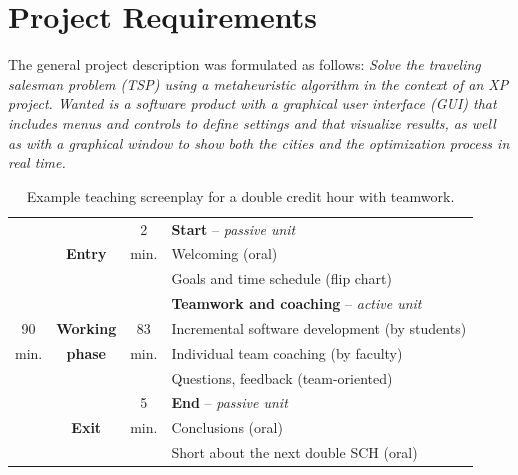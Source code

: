 \documentclass[conference]{IEEEtran}
\begin{document}
\section{Project Requirements}
\label{sec:projreq}

The general project description was formulated as follows: \textit{Solve the traveling salesman problem (TSP) using a metaheuristic algorithm in the context of an XP project. Wanted is a software product with a graphical user interface (GUI) that includes menus and controls to define settings and that visualize results, as well as with a graphical window to show both the cities and the optimization process in real time.}

\begin{table}[!t]
  \renewcommand{\arraystretch}{1.3}
  \setlength{\tabcolsep}{0.6em}
  \caption{Example teaching screenplay for a double credit hour with teamwork.}
  \label{tab:screenplay2}
  \centering
  \begin{tabular}{|c|c|c|l|}
    \hline
         &                  & 2    & \textbf{Start} -- \textit{passive unit} \\
         & \textbf{Entry}   & min. & \hspace{0.5em} Welcoming (oral) \\
         &                  &      & \hspace{0.5em} Goals and time schedule (flip chart) \\
    \cline{2-4}
         &                  &      & \textbf{Teamwork and coaching} -- \textit{active unit} \\
    90   & \textbf{Working} & 83   & \hspace{0.5em} Incremental software development (by students) \\
    min. & \textbf{phase}   & min. & \hspace{0.5em} Individual team coaching (by faculty) \\
         &                  &      & \hspace{0.5em} Questions, feedback (team-oriented) \\
    \cline{2-4}
         &                  & 5    & \textbf{End} -- \textit{passive unit}\\
         & \textbf{Exit}    & min. & \hspace{0.5em} Conclusions (oral) \\
         &                  &      & \hspace{0.5em} Short about the next double SCH (oral) \\
    \cline{1-4}
\end{tabular}
\end{table}
\end{document}
